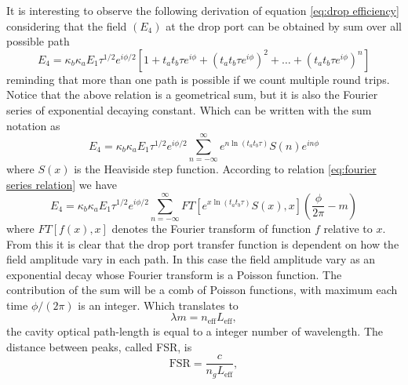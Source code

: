 \documentclass[12pt,twoside,english]{book}
\renewcommand{\~}{\perispomeni}%
\numberwithin{equation}{section}
\numberwithin{figure}{section}
\begin{document}
It is interesting to observe the following derivation of equation \ref{eq:drop efficiency} considering that the field $(E_4)$ at the drop port can be obtained by sum over all possible path
\begin{equation}
E_{4}=\kappa_{b}\kappa_{a}E_{1}\tau^{1/2}e^{i\phi/2}\left[1+t_{a}t_{b}\tau e^{i\phi}+\left(t_{a}t_{b}\tau e^{i\phi}\right)^{2}+\dots+\left(t_{a}t_{b}\tau e^{i\phi}\right)^{n}\right]
\end{equation}
reminding that more than one path is possible if we count multiple round trips. Notice that the above relation is a geometrical sum, but it is also the Fourier series of  exponential decaying constant. Which can be written with the sum notation as
\begin{equation}
E_{4}=\kappa_{b}\kappa_{a}E_{1}\tau^{1/2}e^{i\phi/2}\sum_{n=-\infty}^{\infty}e^{n\ln\left(t_{a}t_{b}\tau\right)}S\left(n\right)e^{in\phi}
\end{equation}
where $S\left(x\right)$ is the Heaviside step function. According to relation \ref{eq:fourier series relation} we have
\begin{equation}
E_{4}=\kappa_{b}\kappa_{a}E_{1}\tau^{1/2}e^{i\phi/2}\sum_{n=-\infty}^{\infty}FT\left[e^{x\ln\left(t_{a}t_{b}\tau\right)}S\left(x\right),x\right]\left(\frac{\phi}{2\pi}-m\right)
\end{equation}
where $FT\left[f\left(x\right),x\right]$ denotes the Fourier transform of function $f$ relative to $x$. From this it is clear that the drop port transfer function is dependent on how the field amplitude vary in each path. In this case the field amplitude vary as an exponential decay whose Fourier transform is a Poisson function. The contribution of the sum will be a comb of Poisson functions, with maximum each time $\phi/\left(2\pi\right)$ is an integer. Which translates to
\begin{equation}
\lambda m = n_{\text{eff}}L_{\text{eff}},
\end{equation}
the cavity optical path-length is equal to a integer number of wavelength. The distance between peaks, called \gls{FSR}, is
\begin{equation}
\text{FSR} = \frac{c}{n_g L_{\text{eff}}},
\end{equation}
 
\end{document}
